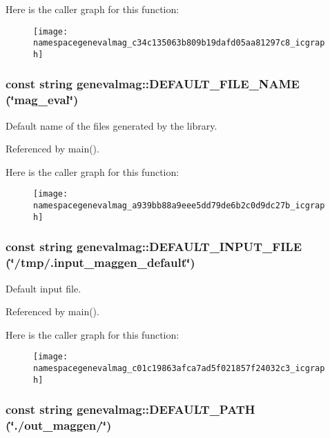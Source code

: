 Here is the caller graph for this function:\nopagebreak
\begin{figure}[H]
\begin{center}
\leavevmode
\texttt{[image: namespacegenevalmag\_c34c135063b809b19dafd05aa81297c8\_icgraph]}
\end{center}
\end{figure}
\hypertarget{namespacegenevalmag_a939bb88a9eee5dd79de6b2c0d9dc27b}{
\subsubsection[{DEFAULT\_\-FILE\_\-NAME}]{\setlength{\rightskip}{0pt plus 5cm}const string genevalmag::DEFAULT\_\-FILE\_\-NAME (\char`\"{}mag\_\-eval\char`\"{})}}
\label{namespacegenevalmag_a939bb88a9eee5dd79de6b2c0d9dc27b}


Default name of the files generated by the library. 

Referenced by main().

Here is the caller graph for this function:\nopagebreak
\begin{figure}[H]
\begin{center}
\leavevmode
\texttt{[image: namespacegenevalmag\_a939bb88a9eee5dd79de6b2c0d9dc27b\_icgraph]}
\end{center}
\end{figure}
\hypertarget{namespacegenevalmag_c01c19863afca7ad5f021857f24032c3}{
\subsubsection[{DEFAULT\_\-INPUT\_\-FILE}]{\setlength{\rightskip}{0pt plus 5cm}const string genevalmag::DEFAULT\_\-INPUT\_\-FILE (\char`\"{}/tmp/.input\_\-maggen\_\-default\char`\"{})}}
\label{namespacegenevalmag_c01c19863afca7ad5f021857f24032c3}


Default input file. 

Referenced by main().

Here is the caller graph for this function:\nopagebreak
\begin{figure}[H]
\begin{center}
\leavevmode
\texttt{[image: namespacegenevalmag\_c01c19863afca7ad5f021857f24032c3\_icgraph]}
\end{center}
\end{figure}
\hypertarget{namespacegenevalmag_7bb640f537df129ffe4ed8cc5f703d90}{
\subsubsection[{DEFAULT\_\-PATH}]{\setlength{\rightskip}{0pt plus 5cm}const string genevalmag::DEFAULT\_\-PATH (\char`\"{}./out\_\-maggen/\char`\"{})}}
\label{namespacegenevalmag_7bb640f537df129ffe4ed8cc5f703d90}


